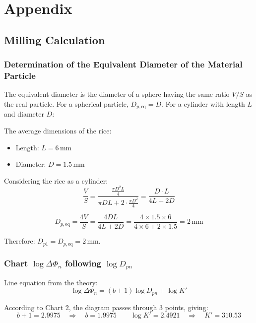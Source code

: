 \section{Appendix}

\subsection{Milling Calculation}

\subsubsection{Determination of the Equivalent Diameter of the Material Particle}

The equivalent diameter is the diameter of a sphere having the same ratio $V/S$ as the real particle. For a spherical particle, $D_{p,\text{eq}} = D$. For a cylinder with length $L$ and diameter $D$:

The average dimensions of the rice:
\begin{itemize}
    \item Length: $L = 6$\,mm
    \item Diameter: $D = 1.5$\,mm
\end{itemize}

Considering the rice as a cylinder:
\begin{equation*}
    \frac{V}{S} = \frac{\frac{\pi D^2 L}{4}}{\pi D L + 2 \cdot \frac{\pi D^2}{4}} = \frac{D \cdot L}{4L + 2D}
\end{equation*}

\begin{equation*}
    D_{p,\text{eq}} = \frac{4V}{S} = \frac{4DL}{4L + 2D} = \frac{4 \times 1.5 \times 6}{4 \times 6 + 2 \times 1.5} = 2\,\text{mm}
\end{equation*}

Therefore: $D_{p1} = D_{p,\text{eq}} = 2$\,mm.

\subsubsection{Chart $\log\Delta\varPhi_n$ following $\log D_{pn}$}

Line equation from the theory:
\begin{equation*}
    \log\Delta\varPhi_n = (b+1)\log D_{pn} + \log K'
\end{equation*}

According to Chart 2, the diagram passes through 3 points, giving:
\begin{equation*}
    b + 1 = 2.9975 \quad \Rightarrow \quad b = 1.9975
    \qquad
    \log K' = 2.4921 \quad \Rightarrow \quad K' = 310.53
\end{equation*}

